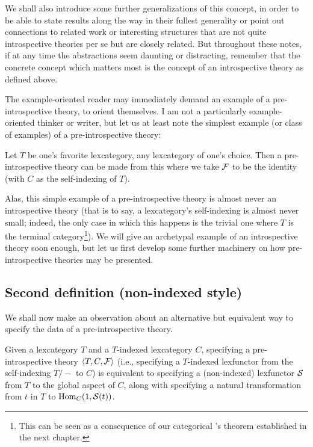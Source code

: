 We shall also introduce some further generalizations of this concept, in order to be able to state results along the way in their fullest generality or point out connections to related work or interesting structures that are not quite introspective theories per se but are closely related. But throughout these notes, if at any time the abstractions seem daunting or distracting, remember that the concrete concept which matters most is the concept of an introspective theory as defined above.

The example-oriented reader may immediately demand an example of a pre-introspective theory, to orient themselves. I am not a particularly example-oriented thinker or writer, but let us at least note the simplest example (or class of examples) of a pre-introspective theory:

\begin{example} \label{TrivialPreIntrospIndexed}
Let $T$ be one's favorite lexcategory, any lexcategory of one's choice. Then a pre-introspective theory can be made from this where we take $\mathcal{F}$ to be the identity (with $C$ as the self-indexing of $T$).
\end{example}

Alas, this simple example of a pre-introspective theory is almost never an introspective theory (that is to say, a lexcategory's self-indexing is almost never small; indeed, the only case in which this happens is the trivial one where $T$ is the terminal category\footnote{This can be seen as a consequence of our categorical \Loeb's theorem established in the next chapter.}). We will give an archetypal example of an introspective theory soon enough, but let us first develop some further machinery on how pre-introspective theories may be presented.

\subsection{Second definition (non-indexed style)}

We shall now make an observation about an alternative but equivalent way to specify the data of a pre-introspective theory.

\begin{theorem}\label{SNCorrespondence}
Given a lexcategory $T$ and a $T$-indexed lexcategory $C$, specifying a pre-introspective theory $\langle T, C, \mathcal{F} \rangle$ (i.e., specifying a $T$-indexed lexfunctor from the self-indexing $T/-$ to $C$) is equivalent to specifying a (non-indexed) lexfunctor $\mathcal{S}$ from $T$ to the global aspect of $C$, along with specifying a natural transformation from $t$ in $T$ to $\operatorname{Hom}_C(1, \mathcal{S}(t))$.
\end{theorem}

